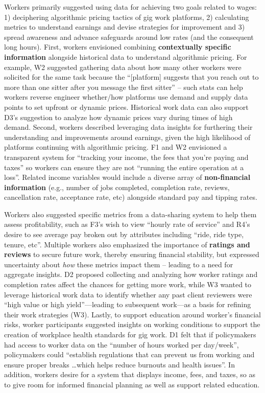 Workers {primarily} suggested {using} data for {achieving two goals} related to wages: 1) deciphering algorithmic pricing tactics of gig work platforms, 2) calculating metrics to understand earnings and devise strategies for improvement {and 3) spread awareness and advance safeguards around low rates (and the consequent long hours)}. First, workers envisioned combining \textbf{contextually specific information} alongside historical data {to understand algorithmic pricing}. For example, W2 suggested gathering data about how many other workers were solicited for the same task because the ``[platform] suggests that you reach out to more than one sitter after you message the first sitter'' {-- such stats can help workers} reverse engineer whether/how platforms use demand and supply data points to set upfront or dynamic prices. Historical work data can also support D3’s suggestion to analyze how dynamic prices vary during times of high demand. Second, {workers described leveraging data insights for furthering their understanding and improvements around earnings,} given the high likelihood of platforms continuing with algorithmic pricing. F1 and W2 envisioned a {transparent} system for ``tracking your income, the fees that you're paying and taxes'' so workers can ensure they are not ``running the entire operation at a loss''. Related income variables would include a diverse array of \textbf{non-financial information} (e.g., number of jobs completed, completion rate, reviews, cancellation rate, acceptance rate, etc) alongside standard pay and tipping rates.  

Workers also suggested specific metrics from a data-sharing system to help them assess profitability, such as F3’s wish to view ``hourly rate of service'' and R4’s desire to see average pay broken out by attributes including ``ride, ride type, tenure, etc''. Multiple workers also emphasized the importance of \textbf{ratings and reviews} to secure future work, thereby ensuring financial stability, but expressed uncertainty about \textit{how} these metrics impact them -- leading to a need for aggregate insights. D2 proposed collecting and analyzing {how} worker ratings and completion rates  affect the chances for getting more work{, while} W3 {wanted to leverage historical} work data to identify whether any past client reviewers were ``high value or high yield''---leading to subsequent work---as a basis for refining their work strategies (W3). {Lastly, to} support education around worker's financial risks, {worker} participants suggested insights on working conditions to support the creation of workplace health standards for gig work. D1 felt that if policymakers had access to worker data on the ``number of hours worked per day/week'', policymakers could ``establish regulations that can prevent us from working and ensure proper breaks  \dots  which helps reduce burnouts and health issues''. In addition, workers desire for a system that displays income, fees, and taxes, so as to give room for informed financial planning as well as support related education.

